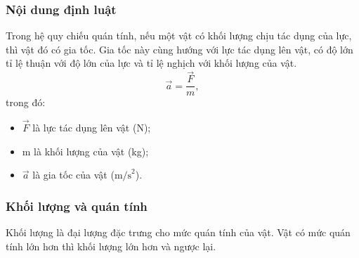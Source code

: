 \subsubsection{Nội dung định luật}
Trong hệ quy chiếu quán tính, nếu một vật có khối lượng chịu tác dụng của lực, thì vật đó có gia tốc. Gia tốc này cùng hướng với lực tác dụng lên vật, có độ lớn tỉ lệ thuận với độ lớn của lực và tỉ lệ nghịch với khối lượng của vật.
\begin{equation*}
	\vec{a}=\dfrac{\vec F}{m},
\end{equation*}
trong đó:
\begin{itemize}
	\item $\vec F$ là lực tác dụng lên vật (N);
	\item m là khối lượng của vật (kg);
	\item $\vec a$ là gia tốc của vật ($\text{m/s}^2$).
\end{itemize}

\subsubsection{Khối lượng và quán tính}
Khối lượng là đại lượng đặc trưng cho mức quán tính của vật. Vật có mức quán tính lớn hơn thì khối lượng lớn hơn và ngược lại. 







